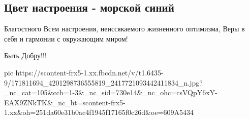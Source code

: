  
 
 
 
 

\subsection{Цвет настроения - морской синий}

Благостного Всем настроения, неиссякаемого жизненного оптимизма, Веры в себя и
гармонии с окружающим миром! 

Быть Добру!!!

\ifcmt
  pic https://scontent-frx5-1.xx.fbcdn.net/v/t1.6435-9/171811694_4201298736555819_2417721093442411834_n.jpg?_nc_cat=105&ccb=1-3&_nc_sid=730e14&_nc_ohc=csVQpY6xY-EAX9ZNkTK&_nc_ht=scontent-frx5-1.xx&oh=251da60e31b0ac4f1945f17165f0c26d&oe=609A5434
\fi

